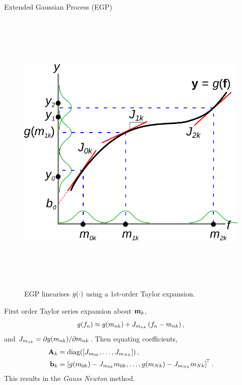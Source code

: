 \documentclass[final]{beamer}
\newlength{\onecolwid}
\newlength{\twocolwid}
\begin{document}
\begin{frame}[t]
\begin{columns}[t]
\begin{column}{\twocolwid}
\begin{columns}[t,totalwidth=\twocolwid]
\begin{column}{\onecolwid}
\begin{block}{Extended Gaussian Process (EGP)}
\begin{figure}
    \includegraphics[height=14cm]{fig/taylor_gp}
    \hspace{3cm}
\caption{EGP linearises  $g\!\left({{\cdot}}\right)$ using a 1st-order Taylor  expansion.}
\end{figure}        

First order Taylor series expansion about $\mathbf{m}_k$,
\begin{equation*}
    g\!\left({{f_n}}\right) \approx g\!\left({{m_{nk}}}\right) +
        {J}_{m_{nk}}
        \left({f_n - m_{nk}}\right),
\end{equation*}
and ${J}_{m_{nk}} = 
    \partial g\!\left({{m_{nk}}}\right)\!/\partial m_{nk}$. Then equating 
coefficients,
\begin{align}
    \mathbf{A}_k &= \text{diag}\!\left({\left[{{J}_{m_{0k}}, \ldots,
        {J}_{m_{Nk}}}\right]}\right), \\
    \mathbf{b}_k &= \left[{g\!\left({{m_{0k}}}\right) - 
            {J}_{m_{0k}}m_{0k}, \ldots,
            g\!\left({{m_{Nk}}}\right) - {J}_{m_{Nk}}m_{Nk}}\right]
            ^{\!\top}. \nonumber
\end{align}
This results in the \emph{Gauss Newton} method.


\end{block}
\end{column}
\end{columns}
\end{column}
\end{columns}
\end{frame}
\end{document}
